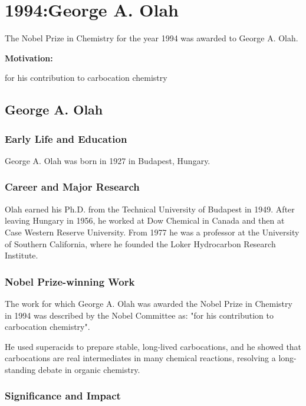 \chapter{1994:George A. Olah}

\label{chap:chemistry1994}

The Nobel Prize in Chemistry for the year 1994 was awarded to George A. Olah.

\textbf{Motivation:}

for his contribution to carbocation chemistry

\section{George A. Olah}

\subsection*{Early Life and Education}

George A. Olah was born in 1927 in Budapest, Hungary.

\subsection*{Career and Major Research}

Olah earned his Ph.D. from the Technical University of Budapest in 1949. After leaving Hungary in 1956, he worked at Dow Chemical in Canada and then at Case Western Reserve University. From 1977 he was a professor at the University of Southern California, where he founded the Loker Hydrocarbon Research Institute.

\subsection*{Nobel Prize-winning Work}

The work for which George A. Olah was awarded the Nobel Prize in Chemistry in 1994 was described by the Nobel Committee as: "for his contribution to carbocation chemistry".

He used superacids to prepare stable, long-lived carbocations, and he showed that carbocations are real intermediates in many chemical reactions, resolving a long-standing debate in organic chemistry.

\subsection*{Significance and Impact}

